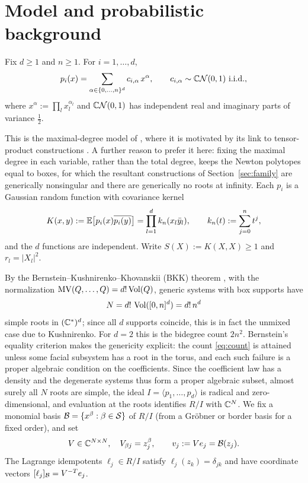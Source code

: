 \section{Model and probabilistic background}\label{sec:model}

\begin{definition}\label{def:model}
  Fix $d\ge1$ and $n\ge1$. For $i=1,\dots,d$,
  \[
    p_i(x) = \sum_{\alpha\in\{0,\dots,n\}^d} c_{i,\alpha}\,x^\alpha,
    \qquad c_{i,\alpha}\sim\mathbb{C}\mathcal{N}(0,1)\ \text{i.i.d.},
  \]
  where $x^\alpha := \prod_l x_l^{\alpha_l}$ and $\mathbb{C}\mathcal{N}(0,1)$ has independent real and imaginary
  parts of variance $\frac12$.
\end{definition}

This is the maximal-degree model of \cite{noferini2016numerical}, where it is motivated by its
link to tensor-product constructions \cite[Sec.~2.1]{noferini2016numerical}. A further reason
to prefer it here: fixing the maximal degree in each variable, rather than the total degree,
keeps the Newton polytopes equal to boxes, for which the resultant constructions of
Section~\ref{sec:family} are generically nonsingular and there are generically no roots at
infinity. Each $p_i$ is a Gaussian random function with covariance kernel
\begin{equation}\label{eq:kernel}
  K(x,y) := \mathbb{E}\bigl[p_i(x)\overline{p_i(y)}\bigr] = \prod_{l=1}^d k_n(x_l\bar y_l),
  \qquad k_n(t):=\sum_{j=0}^n t^j,
\end{equation}
and the $d$ functions are independent. Write $S(X):=K(X,X)\ge1$ and $r_l=|X_l|^2$.

By the Bernstein--Kushnirenko--Khovanskii (BKK) theorem \cite{bernstein1975roots}, with the
normalization $\mathrm{MV}(Q,\dots,Q)=d!\operatorname{Vol}(Q)$, generic systems with box supports have
\begin{equation}\label{eq:count}
  N = d!\,\operatorname{Vol}([0,n]^d) = d!\,n^d
\end{equation}
simple roots in $(\mathbb{C}^*)^d$; since all $d$ supports coincide, this is in fact the unmixed case
due to Kushnirenko. For $d=2$ this is the bidegree count $2n^2$. Bernstein's equality
criterion \cite{bernstein1975roots} makes the genericity explicit: the count \eqref{eq:count}
is attained unless some facial subsystem has a root in the torus, and each such failure is a
proper algebraic condition on the coefficients. Since the coefficient law has a density and
the degenerate systems thus form a proper algebraic subset, almost surely all $N$ roots are
simple, the ideal $I=\langle p_1,\dots,p_d\rangle$ is radical and zero-dimensional, and
evaluation at the roots identifies $R/I$ with $\mathbb{C}^N$. We fix a monomial
basis $\mathcal{B}=\{x^\beta : \beta\in\mathcal{S}\}$ of $R/I$ (from a Gr\"obner or border basis for a fixed
order), and set
\[
  V\in\mathbb{C}^{N\times N}, \quad V_{\beta j} = z_j^\beta, \qquad v_j := Ve_j = \mathcal{B}(z_j).
\]
The Lagrange idempotents $\ell_j\in R/I$ satisfy $\ell_j(z_k)=\delta_{jk}$ and have coordinate
vectors $[\ell_j]_{\mathcal{B}} = V^{-T}e_j$.

